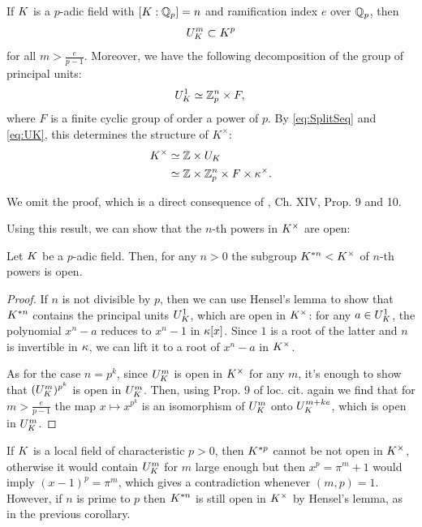 \documentclass[a4paper, oneside]{memoir}
\begin{document}
\begin{theorem}\label{thm:StructureLocalFields}
    If $K$ is a $p$-adic field with $[K:\mathbb{Q}_p]=n$ and ramification index $e$ over $\mathbb{Q}_p$, then
    \[
        U_K^m \subset K^p
    \]
    for all $m> \frac{e}{p-1}$. Moreover, we have the following decomposition of the group of principal units:
    \begin{equation*}
        U_K^1 \simeq \mathbb{Z}_p^n \times F, \\
    \end{equation*}
    where $F$ is a finite cyclic group of order a power of $p$.
    By \eqref{eq:SplitSeq} and \eqref{eq:UK}, this determines the structure of $K^\times$:
    \begin{align*}
        K^\times & \simeq \mathbb{Z} \times U_K                             \\
                  & \simeq \mathbb{Z} \times \mathbb{Z}_p^n \times F \times \kappa^\times.
    \end{align*}
\end{theorem}

We omit the proof, which is a direct consequence of \cite{SerreCL}, Ch. XIV, Prop. 9 and 10.

Using this result, we can show that the $n$-th powers in $K^\times$ are open:
\begin{corollary}\label{cor:KxOpen}
    Let $K$ be a $p$-adic field. Then, for any $n>0$ the subgroup $K^{*n}<K^\times$ of $n$-th powers is open.
\end{corollary}
\begin{proof}
    If $n$ is not divisible by $p$, then we can use Hensel's lemma to show that $K^{*n}$ contains the principal units $U_K^1$, which are open in $K^\times$: for any $a\in U_K^1$, the polynomial $x^n-a$ reduces to $x^{n} - 1$ in $\kappa[x]$. Since $1$ is a root of the latter and $n$ is invertible in $\kappa$, we can lift it to a root of $x^n-a$ in $K^\times$.

    As for the case $n=p^k$, since $U_K^m$ is open in $K^\times$ for any $m$, it's enough to show that $(U_K^m)^{p^k}$ is open in $U_K^m$.
    Then, using Prop. 9 of loc. cit. again we find that for $m>\frac{e}{p-1}$ the map $x\mapsto x^{p^k}$ is an isomorphism of $U_K^m$ onto $U_K^{m+ke}$, which is open in $U_K^m$.
\end{proof}

\begin{remark}\label{rm:KxOpenCharP}
    If $K$ is a local field of characteristic $p>0$, then $K^{*p}$ cannot be not open in $K^\times$, otherwise it would contain $U_K^m$ for $m$ large enough but then $x^p = \pi^m + 1$ would imply $(x-1)^p = \pi^m$, which gives a contradiction whenever $(m,p)=1$.
    However, if $n$ is prime to $p$ then $K^{*n}$ is still open in $K^\times$ by Hensel's lemma, as in the previous corollary.
\end{remark}
\end{document}
